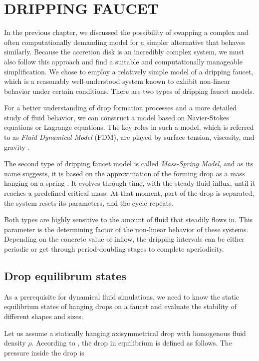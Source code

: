 \chapter{DRIPPING FAUCET}
\label{chap:dripping_faucet}
    In the previous chapter, we discussed the possibility of swapping a complex and often computationally demanding model for a simpler alternative that behaves similarly. Because the accretion disk is an incredibly complex system, we must also follow this approach and find a suitable and computationally manageable simplification. We chose to employ a relatively simple model of a dripping faucet, which is a reasonably well-understood system known to exhibit non-linear behavior under certain conditions. There are two types of dripping faucet models. 

    For a better understanding of drop formation processes and a more detailed study of fluid behavior, we can construct a model based on Navier-Stokes equations or Lagrange equations. The key roles in such a model, which is referred to as \emph{Fluid Dynamical Model} (FDM), are played by surface tension, viscosity, and gravity \cite{faucet1998}.   

    The second type of dripping faucet model is called \emph{Mass-Spring Model}, and as its name suggests, it is based on the approximation of the forming drop as a mass hanging on a spring \cite{shaw1984}. It evolves through time, with the steady fluid influx, until it reaches a predefined critical mass. At that moment, part of the drop is separated, the system resets its parameters, and the cycle repeats. 

    Both types are highly sensitive to the amount of fluid that steadily flows in. This parameter is the determining factor of the non-linear behavior of these systems. Depending on the concrete value of inflow, the dripping intervals can be either periodic or get through period-doubling stages to complete aperiodicity. 

\section{Drop equilibrum states}
    As a prerequisite for dynamical fluid simulations, we need to know the static equilibrium states of hanging drops on a faucet and evaluate the stability of different shapes and sizes. 

    Let us assume a statically hanging axisymmetrical drop with homogenous fluid density $\rho$. According to \cite{faucet1998}, the drop in equilibrium is defined as follows. The pressure inside the drop is 
    

